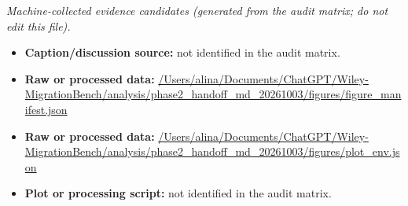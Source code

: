 \emph{Machine-collected evidence candidates (generated from the audit matrix; do not edit this file).}
\begin{itemize}[leftmargin=1.4em,noitemsep]
\item \textbf{Caption/discussion source:} not identified in the audit matrix.
\item \textbf{Raw or processed data:} \url{/Users/alina/Documents/ChatGPT/Wiley-MigrationBench/analysis/phase2_handoff_md_20261003/figures/figure_manifest.json}
\item \textbf{Raw or processed data:} \url{/Users/alina/Documents/ChatGPT/Wiley-MigrationBench/analysis/phase2_handoff_md_20261003/figures/plot_env.json}
\item \textbf{Plot or processing script:} not identified in the audit matrix.
\end{itemize}
